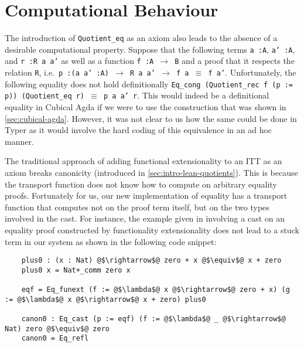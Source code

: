 \documentclass[12pt,twoside,maitrise]{dms}
\theoremstyle{definition}
\numberwithin{equation}{section}
\numberwithin{table}{chapter}
\numberwithin{figure}{chapter}
\newcommand\id[1] {\texttt{#1}}
\newcommand\fn[1] {\texttt{#1}}
\begin{document}
\section*{Computational Behaviour}\label{sec:eval-computation-behaviour}

The introduction of \id{Quotient\_eq} as an axiom also leads to the absence of a
desirable computational property. Suppose that the following terms \fn{a :\@ A},
\fn{a' :\@ A}, and \fn{r :\@ R a a'} as well as a function \fn{f :\@ A $\rightarrow$
  B} and a proof that it respects the relation \id{R}, i.e.\ \fn{p :\@ (a a' :\@ A)
  $\rightarrow$ R a a' $\rightarrow$ f a $\equiv$ f a'}. Unfortunately, the
following equality does not hold definitionally \fn{Eq\_cong (Quotient\_rec f (p
  := p)) (Quotient\_eq r) $\equiv$ p a a' r}. This would indeed be a
definitional equality in Cubical Agda if we were to use the construction that
was shown in \autoref{sec:cubical-agda}. However, it was not clear to us how the
same could be done in Typer as it would involve the hard coding of this
equivalence in an ad hoc manner.

The traditional approach of adding functional extensionality to an ITT as an
axiom breaks canonicity (introduced in \autoref{sec:intro-lean-quotients}).
This is because the transport function does not know how to compute on
arbitrary equality proofs. Fortunately for us, our new implementation of
equality has a transport function that computes not on the proof term itself,
but on the two types involved in the cast. For instance, the example given
in\cite{altenkirch2007observational} involving a cast on an equality proof
constructed by functionality extensionality does not lead to a stuck term in
our system as shown in the following code snippet:

\begin{verbatim}
    plus0 : (x : Nat) @$\rightarrow$@ zero + x @$\equiv$@ x + zero
    plus0 x = Nat+_comm zero x

    eqf = Eq_funext (f := @$\lambda$@ x @$\rightarrow$@ zero + x) (g := @$\lambda$@ x @$\rightarrow$@ x + zero) plus0

    canon0 : Eq_cast (p := eqf) (f := @$\lambda$@ _ @$\rightarrow$@ Nat) zero @$\equiv$@ zero
    canon0 = Eq_refl
\end{verbatim}
\end{document}
